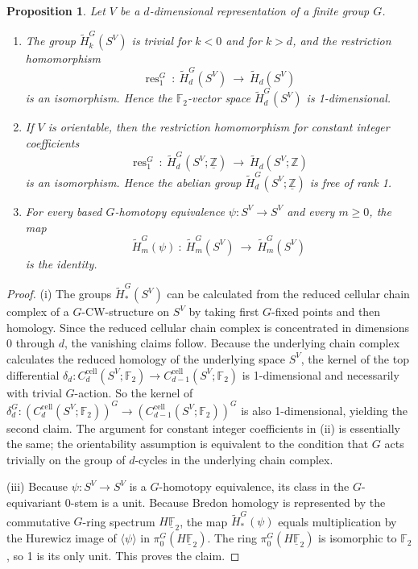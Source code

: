 \documentclass{amsart}[12pt]
\DeclareMathOperator{\res}{res}
\newcommand{\mF}{{\mathbb F}}
\newcommand{\mZ}{{\mathbb Z}}
\newcommand{\td}[1]{\langle #1\rangle}
\renewcommand{\to}{\longrightarrow}
\numberwithin{equation}{section}
\newtheorem{prop}[equation]{Proposition}
\theoremstyle{definition}
\begin{document}
\begin{prop}\label{prop:vanish high degrees}
  Let $V$ be a $d$-dimensional representation of a finite group $G$.  
  \begin{enumerate}[\em (i)]
  \item
    The group $\tilde H_k^G(S^V)$ is trivial for $k<0$ and for $k>d$,
    and the restriction homomorphism
    \[ \res^G_1\ :\  \tilde H_d^G(S^V)\ \to \  \tilde H_d(S^V) \]
    is an isomorphism. Hence the $\mF_2$-vector space $\tilde H_d^G(S^V)$ is 1-dimensional.
  \item
    If $V$ is orientable, then the restriction homomorphism for constant integer coefficients
    \[ \res^G_1\ :\  \tilde H_d^G(S^V;\underline{\mZ})\ \to \  \tilde H_d(S^V;\mZ) \]
    is an isomorphism.
    Hence the abelian group $\tilde H_d^G(S^V;\underline\mZ)$ is free of rank 1.
  \item
    For every based $G$-homotopy equivalence $\psi:S^V\to S^V$ and every $m\geq 0$, the map
    \[  \tilde H^G_m(\psi)\ : \ \tilde H^G_m(S^V) \ \to \  \tilde H^G_m(S^V)   \]
    is the identity.
\end{enumerate}
\end{prop}
\begin{proof}
  (i) The groups $\tilde H_*^G(S^V)$ can be calculated from
  the reduced cellular chain complex of a $G$-CW-structure on $S^V$
  by taking first $G$-fixed points and then homology.
  Since the reduced cellular chain complex is concentrated 
  in dimensions 0 through $d$, the vanishing claims follow.
  Because the underlying chain complex calculates the reduced homology
  of the underlying space $S^V$, the kernel of the top differential
  $\delta_d:C_d^{\text{cell}}(S^V;\mF_2)\to C_{d-1}^{\text{cell}}(S^V;\mF_2)$
  is 1-dimensional and necessarily with trivial $G$-action. So the kernel of 
  $\delta_d^G:(C_d^{\text{cell}}(S^V;\mF_2))^G\to (C_{d-1}^{\text{cell}}(S^V;\mF_2))^G$
  is also 1-dimensional, yielding the second claim.
  The argument for constant integer coefficients in (ii) is essentially the same;
  the orientability assumption is equivalent to the condition
  that $G$ acts trivially on the group of $d$-cycles in the underlying chain complex.

  (iii)
  Because $\psi:S^V\to S^V$ is a $G$-homotopy equivalence, its class
  in the $G$-equivariant 0-stem is a unit.
  Because Bredon homology is represented by the commutative $G$-ring spectrum
  $H\underline\mF_2$, the map $\tilde H^G_*(\psi)$ equals multiplication
  by the Hurewicz image of $\td{\psi}$ in $\pi_0^G(H\underline\mF_2)$.
  The ring $\pi_0^G(H\underline\mF_2)$ is isomorphic to $\mF_2$, so 1 is its only unit.
  This proves the claim.
\end{proof}
\end{document}
